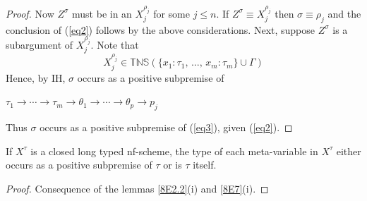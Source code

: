 \documentclass[a4paper,10pt]{article}
\begin{document}
\begin{lem}
\begin{proof}
Now $Z^{\sigma}$ must be in an $X^{\rho_j}_j$ for some $j \leq n$. If $Z^{\sigma} \equiv X^{\rho_j}_j$ then $\sigma \equiv \rho_j$ and the conclusion of (\ref{eq2}) follows
by the above considerations. Next, suppose $Z^{\sigma}$ is a subargument of $X^{\rho_j}_j$. Note that
\begin{equation}
 X^{\rho_j}_j \in \mathbb{TNS}(\{x_1:\tau_1,\,...,\,x_m:\tau_m\}\cup\Gamma)
\end{equation}
Hence, by IH, $\sigma$ occurs as a positive subpremise of 
\begin{center}
$\tau_1\to\cdots\to\tau_m\to\theta_1\to\cdots\to\theta_p\to p_j$ 
\end{center}
Thus $\sigma$ occurs as a positive subpremise of (\ref{eq3}), given (\ref{eq2}).
\end{proof}
\end{lem}

\begin{col} 
 If $X^{\tau}$ is a closed long typed nf-scheme, the type of each meta-variable in $X^{\tau}$ either occurs as a positive subpremise of $\tau$ or is $\tau$ itself.
\begin{proof}
   Consequence of the lemmas \ref{8E2.2}(i) and \ref{8E7}(i).
 \end{proof}
\end{col}
\end{document}
